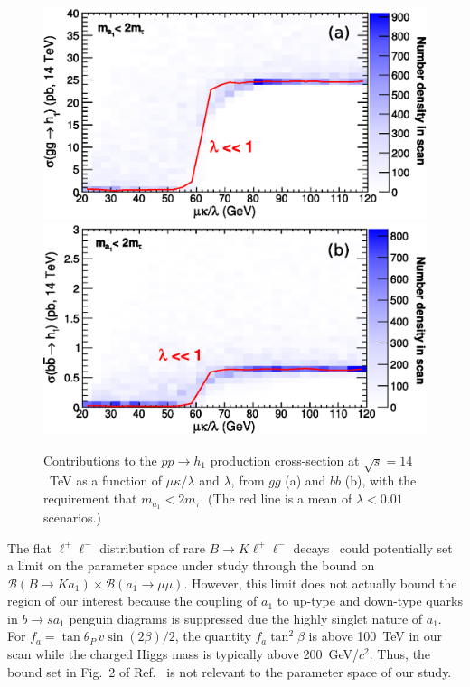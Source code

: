 \documentclass[aps,prl,twocolumn,nofootinbib,superscriptaddress]{revtex4}
\begin{document}
\begin{figure}[htb]
\includegraphics[width=0.48\linewidth]{crosssec_vs_mukoverl_gg}
\hfill
\includegraphics[width=0.48\linewidth]{crosssec_vs_mukoverl_bb}

\caption{Contributions to the $pp \to h_1$ production cross-section at
  $\sqrt{s}=14$~TeV as a function of $\mu\kappa/\lambda$ and
  $\lambda$, from $gg$ (a) and $b\bar{b}$ (b), with the requirement
  that $m_{a_1} < 2m_\tau$.  (The red line is a mean of $\lambda <
  0.01$ scenarios.)
  \label{fig:sm_mukoverl2}}
\end{figure}

The flat $\ell^+\ell^-$ distribution of rare $B \to K \ell^+\ell^-$
decays~\cite{:2008sk} could potentially set a limit on the parameter
space under study through the bound on $\mathcal{B}(B \to K a_1)
\times \mathcal{B}(a_1 \to \mu\mu)$. However, this limit does not
actually bound the region of our interest because the coupling of
$a_1$ to up-type and down-type quarks in $b \to s a_1$ penguin
diagrams is suppressed due the highly singlet nature of $a_1$.  For
$f_a = \tan\theta_P \, v \sin(2\beta)/2$, the quantity $f_a \tan^2\beta$
is above 100~TeV in our scan while the charged Higgs mass is typically
above 200~GeV/$c^2$.  Thus, the bound set in Fig.~2 of
Ref.~\cite{Freytsis:2009ct} is not relevant to the parameter space of our
study.
\end{document}
